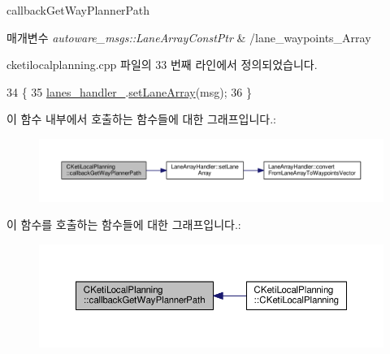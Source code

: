 callback\+Get\+Way\+Planner\+Path 


\begin{DoxyParams}{매개변수}
{\em autoware\+\_\+msgs\+::\+Lane\+Array\+Const\+Ptr} & /lane\+\_\+waypoints\+\_\+\+Array \\
\hline
\end{DoxyParams}


cketilocalplanning.\+cpp 파일의 33 번째 라인에서 정의되었습니다.


\begin{DoxyCode}
34 \{
35   \hyperlink{class_c_keti_local_planning_a6295120665288244397783d747cc60cf}{lanes\_handler\_}.\hyperlink{class_lane_array_handler_a345c18674ccfcbf1104bd5b030e04c0b}{setLaneArray}(msg);
36 \}
\end{DoxyCode}


이 함수 내부에서 호출하는 함수들에 대한 그래프입니다.\+:\nopagebreak
\begin{figure}[H]
\begin{center}
\leavevmode
\includegraphics[width=350pt]{class_c_keti_local_planning_ab385a1021d3d90f9f2b7b5a40dd791c2_cgraph}
\end{center}
\end{figure}




이 함수를 호출하는 함수들에 대한 그래프입니다.\+:\nopagebreak
\begin{figure}[H]
\begin{center}
\leavevmode
\includegraphics[width=350pt]{class_c_keti_local_planning_ab385a1021d3d90f9f2b7b5a40dd791c2_icgraph}
\end{center}
\end{figure}


